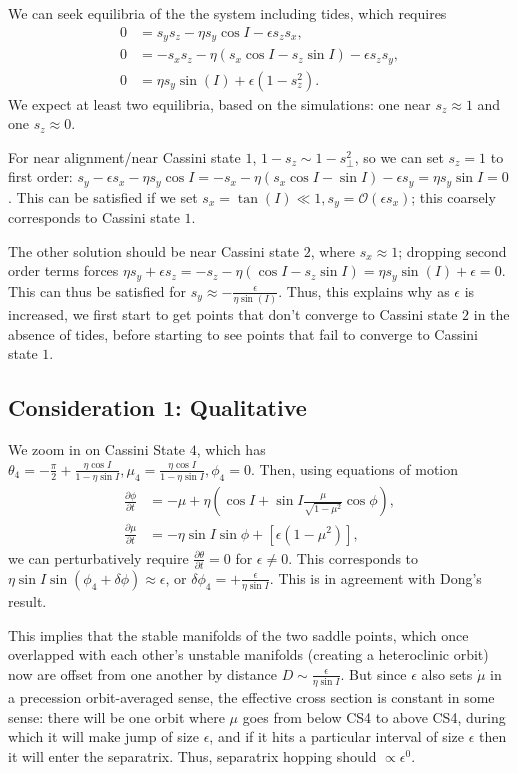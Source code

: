 \documentclass[11pt,
        usenames, %
        dvipsnames %
    ]{article}
\newcommand*{\pd}[2]{\frac{\partial#1}{\partial#2}}
\newcommand*{\p}[1]{\left(#1\right)}
\newcommand*{\s}[1]{\left[#1\right]}
\begin{document}
We can seek equilibria of the the system including tides, which requires
\begin{align*}
    0 &= s_ys_z - \eta s_y\cos I - \epsilon s_zs_x,\\
    0 &= -s_xs_z - \eta\p{s_x \cos I - s_z \sin I} - \epsilon s_zs_y,\\
    0 &= \eta s_y\sin(I) + \epsilon \p{1 - s_z^2}.
\end{align*}
We expect at least two equilibria, based on the simulations: one near $s_z
\approx 1$ and one $s_z \approx 0$.

For near alignment/near Cassini state $1$, $1 - s_z \sim 1 - s_{\perp}^2$, so we
can set $s_z = 1$ to first order: $s_y - \epsilon s_x - \eta s_y \cos I = -s_x -
\eta\p{s_x \cos I - \sin I} - \epsilon s_y = \eta s_y \sin I = 0$. This can be
satisfied if we set $s_x = \tan(I) \ll 1, s_y = \mathcal{O}\p{\epsilon s_x}$;
this coarsely corresponds to Cassini state $1$.

The other solution should be near Cassini state $2$, where $s_x \approx 1$;
dropping second order terms forces $\eta s_y + \epsilon s_z = -s_z -
\eta\p{\cos I - s_z\sin I} = \eta s_y \sin(I) + \epsilon = 0$. This can thus be
satisfied for $s_y \approx -\frac{\epsilon}{\eta \sin(I)}$. Thus, this explains
why as $\epsilon$ is increased, we first start to get points that don't converge
to Cassini state $2$ in the absence of tides, before starting to see points that
fail to converge to Cassini state $1$.

\subsection{Consideration 1: Qualitative}

We zoom in on Cassini State $4$, which has $\theta_4 =
-\frac{\pi}{2} + \frac{\eta \cos I}{1 - \eta \sin I}, \mu_4 = \frac{\eta \cos
I}{1 - \eta \sin I}, \phi_4 = 0$. Then, using
equations of motion
\begin{align}
    \pd{\phi}{t} &= -\mu + \eta\p{\cos I + \sin I \frac{\mu}{\sqrt{1 - \mu^2}}
        \cos \phi} ,\\
    \pd{\mu}{t} &= -\eta \sin I \sin \phi + \s{\epsilon \p{1 - \mu^2}},
\end{align}
we can perturbatively require $\pd{\theta}{t} = 0$ for $\epsilon \neq 0$. This
corresponds to $\eta \sin I \sin \p{\phi_4 + \delta \phi} \approx \epsilon$, or
$\delta \phi_4 = +\frac{\epsilon}{\eta \sin I}$. This is in agreement with
Dong's result.

This implies that the stable manifolds of the two saddle points, which once
overlapped with each other's unstable manifolds (creating a heteroclinic orbit)
now are offset from one another by distance $D \sim \frac{\epsilon}{\eta \sin
I}$. But since $\epsilon$ also sets $\dot{\mu}$ in a precession orbit-averaged
sense, the effective cross section is constant in some sense: there will be one
orbit where $\mu$ goes from below CS4 to above CS4, during which it will make
jump of size $\epsilon$, and if it hits a particular interval of size $\epsilon$
then it will enter the separatrix. Thus, separatrix hopping should $\propto
\epsilon^0$.
\end{document}
